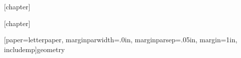 \newenvironment{chapterSummary}[1]{%
\mdfsetup{%
    frametitle={%
        \tikz[baseline=(current bounding box.east),outer sep=0pt]
        \node[anchor=west,rectangle,fill=TBblue, minimum width=5cm,rounded corners=0.2cm]
        {\strut Key Takeaways};},
    frametitlefont=\color{white}\sffamily\bfseries,
    innertopmargin=0pt,linecolor=TBblue,backgroundcolor=TBblue!5,%
    linewidth=1pt,topline=true,%
    frametitleaboveskip=\dimexpr-\ht\strutbox\relax%
}
\vspace{10pt}
\begin{mdframed}[]\relax #1}{%
\end{mdframed}}

[chapter]
\def\thesolution{\thechapter-\arabic{solution}}

\newenvironment{solution}[2]{\refstepcounter{solution}\textbf{Solution to problem \ref{#1}:} #2}
{\vspace{2ex}}

\newenvironment{solutionParts}[2]{\refstepcounter{solution}\textbf{Solution to problem \ref{#1}:}
  \begin{enumerate}[label=\alph*),topsep=-10pt]
   #2
  \end{enumerate}}
  {\vspace{2ex}}

[chapter]
\def\therQuestion{\thechapter-\arabic{tQuestion}}

\newenvironment{tQuestion}[1]{\refstepcounter{tQuestion}%
    \textbf{Activity~\therQuestion: }#1}

\usepackage[paper=letterpaper,
            marginparwidth=.0in,     %
            marginparsep=.05in,       %
            margin=1in,               %
            includemp]{geometry}

\setcounter{secnumdepth}{2}
\setcounter{tocdepth}{3}
